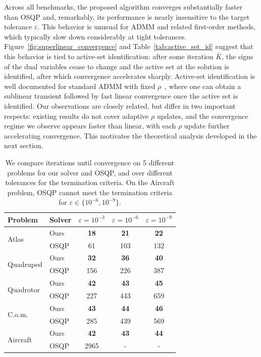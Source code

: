 \documentclass[letterpaper, 10 pt, conference]{ieeeconf}  %
\begin{document}
Across all benchmarks, the proposed algorithm converges substantially faster than OSQP and, remarkably, its performance is nearly insensitive to the target tolerance $\varepsilon$. This behavior is unusual for ADMM and related first-order methods, which typically slow down considerably at tight tolerances. Figure~\ref{fig:superlinear_convergence} and Table~\ref{tab:active_set_id} suggest that this behavior is tied to active-set identification: after some iteration $\bar K$, the signs of the dual variables cease to change and the active set at the solution is identified, after which convergence accelerates sharply. Active-set identification is well documented for standard ADMM with fixed $\rho$~\cite{as_identification}, where one can obtain a sublinear transient followed by fast linear convergence once the active set is identified. Our observations are closely related, but differ in two important respects: existing results do not cover adaptive $\rho$ updates, and the convergence regime we observe appears faster than linear, with each $\rho$ update further accelerating convergence. This motivates the theoretical analysis developed in the next section.


\begin{table}
\centering
\begin{tabular}{llccc}
\toprule
Problem & Solver & $\varepsilon=10^{-3}$ & $\varepsilon=10^{-6}$ & $\varepsilon=10^{-9}$ \\
\midrule
\multirow{2}{*}{Atlas} 
    & Ours & \textbf{18} & \textbf{21} & \textbf{22} \\
    & OSQP & 61 & 103 & 132 \\
\midrule
\multirow{2}{*}{Quadruped} 
    & Ours & \textbf{32} & \textbf{36} & \textbf{40} \\
    & OSQP & 156 & 226 & 387 \\
\midrule
\multirow{2}{*}{Quadrotor} 
    & Ours & \textbf{42} & \textbf{43} & \textbf{45} \\
    & OSQP & 227 & 443 & 659 \\
\midrule
\multirow{2}{*}{C.o.m.} 
    & Ours & \textbf{43} & \textbf{44} & \textbf{46} \\
    & OSQP & 285 & 439 & 569 \\
\midrule
\multirow{2}{*}{Aircraft} 
    & Ours & \textbf{42} & \textbf{43} & \textbf{44} \\
    & OSQP & 2965 & - & - \\
\midrule
\bottomrule
\end{tabular}
\caption{We compare iterations until convergence on 5 different problems for our solver and OSQP, and over different tolerances for the termination criteria. On the Aircraft problem, OSQP cannot meet the termination criteria for $\varepsilon \in \{10^{-6}, 10^{-9}\}$.}
\label{tab:osqp_comp}
\end{table}
\end{document}
